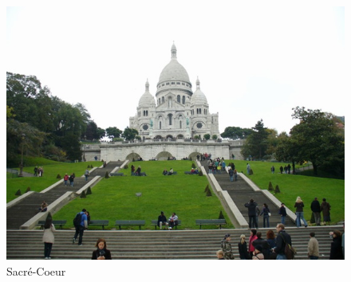 \begin{figure}[h!]
\centering
\includegraphics[scale=0.5]{images/obr5S.jpg}
\caption{Sacré-Coeur}

\end{figure}

